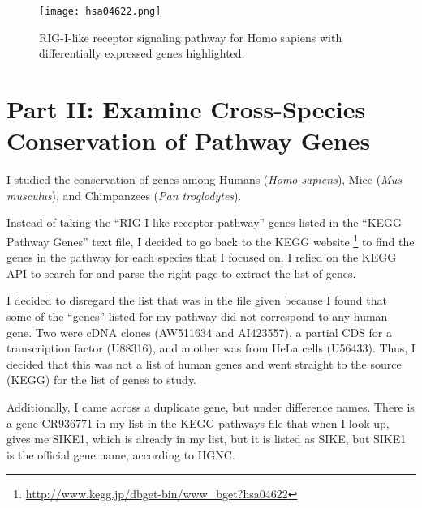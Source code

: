 \documentclass[12pt, a4paper]{report}
\begin{document}
\begin{figure}[ht]
\begin{center}
\texttt{[image: hsa04622.png]}
\caption{RIG-I-like receptor signaling pathway for Homo sapiens with differentially expressed genes highlighted.}
\label{pathway}
\end{center}
\end{figure}


\section*{Part II: Examine Cross-Species Conservation of Pathway Genes}

I studied the conservation of genes among Humans (\emph{Homo sapiens}), Mice (\emph{Mus musculus}), and Chimpanzees (\emph{Pan troglodytes}).

Instead of taking the ``RIG-I-like receptor pathway'' genes listed in the ``KEGG Pathway Genes'' text file, I decided to go back to the KEGG website \footnote{\url{http://www.kegg.jp/dbget-bin/www_bget?hsa04622}} to find the genes in the pathway for each species that I focused on. I relied on the KEGG API to search for and parse the right page to extract the list of genes.

I decided to disregard the list that was in the file given because I found that some of the ``genes'' listed for my pathway did not correspond to any human gene. Two were cDNA clones (AW511634 and AI423557), a partial CDS for a transcription factor (U88316), and another was from HeLa cells (U56433). Thus, I decided that this was not a list of human genes and went straight to the source (KEGG) for the list of genes to study. 

Additionally, I came across a duplicate gene, but under difference names. There is a gene CR936771 in my list in the KEGG pathways file that when I look up, gives me SIKE1, which is already in my list, but it is listed as SIKE, but SIKE1 is the official gene name, according to HGNC. 
\end{document}
